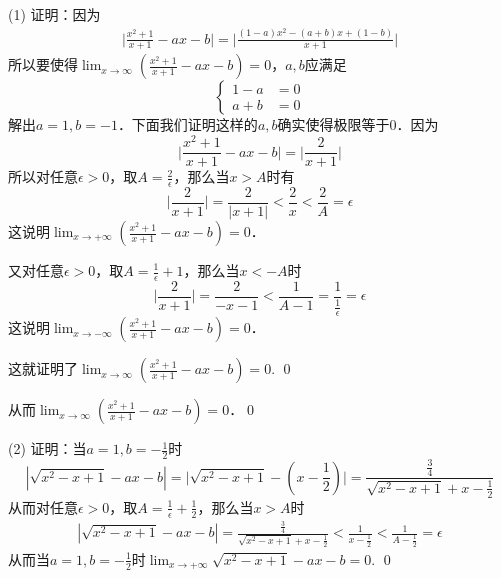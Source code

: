 (1) 证明：因为
\begin{align}
    \bigg\lvert\displaystyle\frac{x^2+1}{x+1}-a x - b\bigg\rvert=\bigg\lvert \displaystyle\frac{(1-a)x^2 - (a+b)x +(1-b)}{x+1} \bigg\rvert
\end{align}
所以要使得$\displaystyle\lim_{x\to\infty}\left(\displaystyle\frac{x^2+1}{x+1}-ax-b\right)=0$，$a,b$应满足
\begin{equation}
    \begin{cases}
        1-a &= 0\\
        a+b &= 0
    \end{cases}
\end{equation}
解出$a=1,b=-1$．下面我们证明这样的$a,b$确实使得极限等于$0$．因为
\begin{equation}
    \bigg\lvert\displaystyle\frac{x^2+1}{x+1}-ax-b\bigg\rvert = \bigg\lvert\displaystyle\frac{2}{x+1}\bigg\rvert
\end{equation}
所以对任意$\epsilon > 0$，取$A=\displaystyle\frac{2}{\epsilon}$，那么当$x>A$时有
\begin{equation}
    \bigg\lvert\displaystyle\frac{2}{x+1}\bigg\rvert=\frac{2}{|x+1|}<\frac{2}{x}<\frac{2}{A}=\epsilon
\end{equation}
这说明$\displaystyle\lim_{x\to +\infty}\left(\displaystyle\frac{x^2+1}{x+1}-ax-b\right)=0$．

又对任意$\epsilon>0$，取$A=\displaystyle\frac{1}{\epsilon}+1$，那么当$x<-A$时
\begin{equation}
    \bigg\lvert\displaystyle\frac{2}{x+1}\bigg\rvert=\frac{2}{-x-1}<\frac{1}{A-1}=\frac{1}{\displaystyle\frac{1}{\epsilon}}=\epsilon
\end{equation}
这说明$\displaystyle\lim_{x\to -\infty}\left(\displaystyle\frac{x^2+1}{x+1}-ax-b\right)=0$．

这就证明了$\displaystyle\lim_{x \to \infty}\left(\displaystyle\frac{x^2+1}{x+1}-ax-b\right)=0$. \qed

从而$\displaystyle\lim_{x\to\infty}\left(\displaystyle\frac{x^2+1}{x+1}-ax-b\right)=0$．\qed

(2) 证明：当$a=1,b=-\displaystyle\frac{1}{2}$时
\begin{equation}
    |\sqrt{x^2-x+1}-ax-b|=\bigg\lvert\sqrt{x^2-x+1}-(x-\displaystyle\frac{1}{2})\bigg\rvert=\displaystyle\frac{\displaystyle\frac{3}{4}}{\sqrt{x^2-x+1}+x-\displaystyle\frac{1}{2}}
\end{equation}
从而对任意$\epsilon > 0$，取$A=\displaystyle\frac{1}{\epsilon}+\displaystyle\frac{1}{2}$，那么当$x>A$时
\begin{align}
    |\sqrt{x^2-x+1}-ax-b|=\displaystyle\frac{\displaystyle\frac{3}{4}}{\sqrt{x^2-x+1}+x-\displaystyle\frac{1}{2}} < \displaystyle\frac{1}{x-\displaystyle\frac{1}{2}}<\displaystyle\frac{1}{A-\displaystyle\frac{1}{2}}=\epsilon
\end{align}
从而当$a=1,b=-\displaystyle\frac{1}{2}$时$\displaystyle\lim_{x\to +\infty}\sqrt{x^2-x+1}-ax-b=0$. \qed

